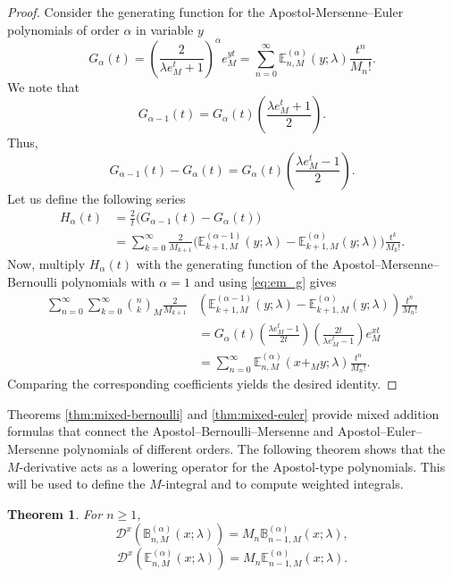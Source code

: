 \documentclass[10pt,a4paper]{amsart}
\newtheorem{theorem}{Theorem}[section]
\numberwithin{equation}{section}
\newcommand{\B}{\mathbb{B}}
\newcommand{\E}{\mathbb{E}}
\begin{document}
\begin{proof}
Consider the generating function for the Apostol-Mersenne–Euler polynomials of order $\alpha$ in variable $y$
\[
G_\alpha(t) = \left(\frac{2}{\lambda e_M^t+1}\right)^\alpha e_M^{yt}
= \sum_{n=0}^\infty \E_{n,M}^{(\alpha)}(y;\lambda) \frac{t^n}{M_n!}. 
\]
We note that
\[
G_{\alpha-1}(t) = G_{\alpha}(t)\left(\frac{\lambda e_M^{t}+1}{2}\right).
\]
Thus,
\begin{equation}\label{eq:em_g}
G_{\alpha-1}(t)-G_{\alpha}(t) = G_{\alpha}(t)\left(\frac{\lambda e_M^{t}-1}{2}\right).
\end{equation}
Let us define the following series
\begin{align*}
H_{\alpha}(t) &= \frac{2}{t}\bigl( G_{\alpha-1}(t) - G_\alpha(t) \bigr)\\
&= \sum_{k=0}^\infty \frac{2}{M_{k+1}}\bigl( \E_{k+1,M}^{(\alpha-1)}(y;\lambda) - \E_{k+1,M}^{(\alpha)}(y;\lambda) \bigr) \frac{t^k}{M_k!}.
\end{align*}
Now, multiply $H_{\alpha}(t)$ with the generating function of the Apostol–Mersenne–Bernoulli polynomials with $\alpha = 1$ and using \eqref{eq:em_g} gives
\begin{align*}
\sum_{n=0}^{\infty}\sum_{k=0}^{\infty}\binom{n}{k}_M \frac{2}{M_{k+1}}&\left(\E_{k+1,M}^{(\alpha-1)}(y;\lambda) - \E_{k+1,M}^{(\alpha)}(y;\lambda)\right) \frac{t^n}{M_n!} \\
&= G_{\alpha}(t)\left(\frac{\lambda e_M^{t}-1}{2t}\right)\left(\frac{2t}{\lambda e_M^{t}-1}\right)e_M^{xt} \\
&= \sum_{n=0}^{\infty} \E_{n,M}^{(\alpha)}(x+_M y;\lambda) \frac{t^n}{M_n!}.
\end{align*}
Comparing the corresponding coefficients yields the desired identity.
\end{proof}
Theorems \ref{thm:mixed-bernoulli} and \ref{thm:mixed-euler} provide mixed addition formulas that connect the Apostol–Bernoulli–Mersenne and Apostol–Euler–Mersenne polynomials of different orders.
The following theorem shows that the $M$-derivative acts as a lowering operator for the Apostol-type polynomials. This will be used to define the $M$-integral and to compute weighted integrals.

\begin{theorem}\label{thm:m-derivative}
For $n\ge 1$,
\begin{equation}\label{eq:apostol-bm-derivative}
\mathcal{D}^x\left(\B_{n,M}^{(\alpha)}(x;\lambda)\right) = M_n \B_{n-1,M}^{(\alpha)}(x;\lambda),
\end{equation}
\begin{equation}\label{eq:apostol-em-derivative}
\mathcal{D}^x\left(\E_{n,M}^{(\alpha)}(x;\lambda)\right) = M_n \E_{n-1,M}^{(\alpha)}(x;\lambda).
\end{equation}
\end{theorem}
\end{document}
